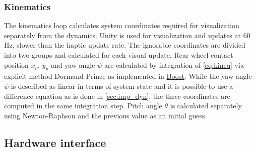 \documentclass[11pt,a4paper,reqno]{amsart}
\newcommand{\x}{x_{p}}
\newcommand{\y}{y_{p}}
\newcommand{\pitch}{\theta}
\newcommand{\yaw}{\psi}
\begin{document}
\subsubsection{Kinematics}
The kinematics loop calculates system coordinates required for visualization separately from the dynamics.
Unity is used for visualization and updates at 60 Hz, slower than the haptic update rate.
The ignorable coordinates are divided into two groups and calculated for each visual update.
Rear wheel contact position $ \x $, $ \y $ and yaw angle $ \yaw $ are calculated by integration of \autoref{eq:kineq}
via explicit method Dormand-Prince as implemented in \href{http://www.boost.org/}{Boost}.
While the yaw angle $ \yaw $ is described as linear in terms of system state and it is possible to use a difference
equation as is done in \autoref{sec:imp_dyn}, the three coordinates are computed in the same integration step.
Pitch angle $ \pitch $ is calculated separately using Newton-Raphson and the previous value as an initial guess.

\subsection{Hardware interface}
\end{document}
